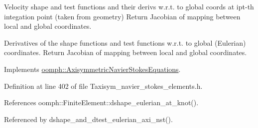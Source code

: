 Velocity shape and test functions and their derivs w.\+r.\+t. to global coords at ipt-\/th integation point (taken from geometry) Return Jacobian of mapping between local and global coordinates. 

Derivatives of the shape functions and test functions w.\+r.\+t. to global (Eulerian) coordinates. Return Jacobian of mapping between local and global coordinates. 

Implements \hyperlink{classoomph_1_1AxisymmetricNavierStokesEquations_a76e090fdac4507d10eb9f81feb53a51b}{oomph\+::\+Axisymmetric\+Navier\+Stokes\+Equations}.



Definition at line 402 of file Taxisym\+\_\+navier\+\_\+stokes\+\_\+elements.\+h.



References oomph\+::\+Finite\+Element\+::dshape\+\_\+eulerian\+\_\+at\+\_\+knot().



Referenced by dshape\+\_\+and\+\_\+dtest\+\_\+eulerian\+\_\+axi\+\_\+nst().

\mbox{\label{classoomph_1_1AxisymmetricTCrouzeixRaviartElement_a63923a44d4da4e1720449521c82f1c42}} 
